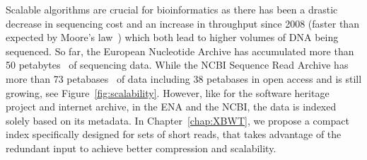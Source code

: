 Scalable algorithms are crucial for bioinformatics as there has been a drastic decrease in sequencing cost and an increase in throughput since 2008 (faster than expected by Moore's law~\cite{muir2016real}) which both lead to higher volumes of DNA being sequenced. 
So far, the European Nucleotide Archive has accumulated more than 50 petabytes~\cite{ena} of sequencing data.
While the NCBI Sequence Read Archive has more than 73 petabases~\cite{sra} of data including 38 petabases in open access and is still growing, see Figure~\ref{fig:scalability}. However, like for the software heritage project and internet archive, in the ENA and the NCBI, the data is indexed solely based on its metadata.
In Chapter~\ref{chap:XBWT}, we propose a compact index specifically designed for sets of short reads, that takes advantage of the redundant input to achieve better compression and scalability. 


